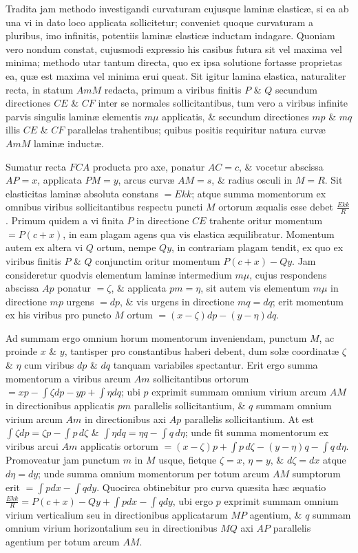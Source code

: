 Tradita jam methodo investigandi curvaturam cujusque laminæ elasticæ, si ea ab una vi in dato loco applicata sollicitetur; conveniet quoque curvaturam a pluribus, imo infinitis, potentiis laminæ elasticæ inductam indagare. Quoniam vero nondum constat, cujusmodi expressio his casibus futura sit vel maxima vel minima; methodo utar tantum directa, quo ex ipsa solutione fortasse proprietas ea, quæ est maxima vel minima erui queat. Sit igitur lamina elastica, naturaliter recta, in statum $AmM$ redacta, primum a viribus finitis $P$ \& $Q$ secundum directiones $CE$ \& $CF$ inter se normales sollicitantibus, tum vero a viribus infinite parvis singulis laminæ elementis $m\mu$ applicatis, \& secundum directiones $mp$ \& $mq$ illis $CE$ \& $CF$ parallelas trahentibus; quibus positis requiritur natura curvæ $AmM$ laminæ inductæ.

Sumatur recta $FCA$ producta pro axe, ponatur $AC=c$, \& vocetur abscissa $AP=x$, applicata $PM=y$, arcus curvæ $AM=s$, \& radius osculi in $M=R$. Sit elasticitas laminæ absoluta constans $=Ekk$; atque summa momentorum ex omnibus viribus sollicitantibus respectu puncti $M$ ortorum æqualis esse debet $\frac{Ekk}R$. Primum quidem a vi finita $P$ in directione $CE$ trahente oritur momentum $=P(c+x)$, in eam plagam agens qua vis elastica æquilibratur. Momentum autem ex altera vi $Q$ ortum, nempe $Qy$, in contrariam plagam tendit, ex quo ex viribus finitis $P$ \& $Q$ conjunctim oritur momentum $P(c+x)-Qy$. Jam consideretur quodvis elementum laminæ intermedium $m\mu$, cujus respondens abscissa $Ap$ ponatur $=\zeta$, \& applicata $pm=\eta$, sit autem vis elementum $m\mu$ in directione $mp$ urgens $=dp$, \& vis urgens in directione $mq=dq$; erit momentum ex his viribus pro puncto $M$ ortum $=(x-\zeta)dp-(y-\eta)dq$.

Ad summam ergo omnium horum momentorum inveniendam, punctum $M$, ac proinde $x$ \& $y$, tantisper pro constantibus haberi debent, dum solæ coordinatæ $\zeta$ \& $\eta$ cum viribus $dp$ \& $dq$ tanquam variabiles spectantur. Erit ergo summa
momentorum a viribus arcum $Am$ sollicitantibus ortorum $=xp-\int\zeta dp-yp+\int\eta dq$; ubi $p$ exprimit summam omnium virium arcum $AM$ in directionibus applicatis $pm$ parallelis sollicitantium, \& $q$ summam omnium virium arcum $Am$ in directionibus axi $Ap$ parallelis sollicitantium. At est $\int\zeta dp=\zeta p-\int p\,d\zeta$ \& $\int\eta dq=\eta q-\int q\,d\eta$; unde fit summa momentorum ex viribus arcui $Am$ applicatis ortorum $=(x-\zeta)p+\int p\,d\zeta-(y-\eta)q-\int q\,d\eta$. Promoveatur jam punctum $m$ in $M$ usque, fietque $\zeta=x$, $\eta=y$, \& $d\zeta=dx$ atque $d\eta=dy$; unde summa omnium momentorum per totum arcum $AM$ sumptorum erit $=\int pdx-\int qdy$. Quocirca obtinebitur pro curva quæsita hæc æquatio $\frac{Ekk}R=P(c+x)-Qy+\int pdx-\int qdy$, ubi ergo $p$ exprimit summam omnium virium verticalium seu in directionibus applicatarum $MP$ agentium, \& $q$ summam omnium virium horizontalium seu in directionibus $MQ$ axi $AP$ parallelis agentium per totum arcum $AM$.

